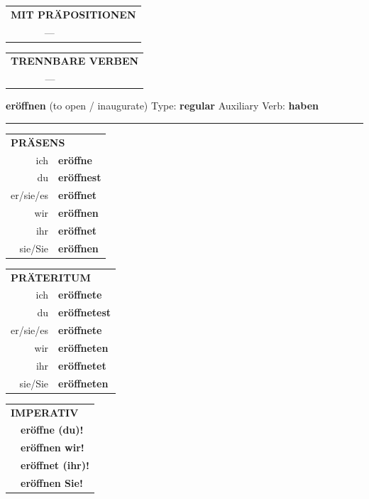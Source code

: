 \documentclass[10pt,a4paper]{revtex4-2}
\begin{document}
\begin{verbbox-acc}
\vspace{10pt}

\begin{tabular}{lll}
\multicolumn{3}{l}{\textbf{MIT PRÄPOSITIONEN}}\\
& ---\\
\end{tabular}
\hfill
\begin{tabular}{lll}
\multicolumn{3}{l}{\textbf{TRENNBARE VERBEN}}\\
& ---\\
\end{tabular}

\vspace{-5pt}
\end{verbbox-acc}

\begin{verbbox}
{\Large \bf eröffnen} (to open / inaugurate) \hfill Type: \textbf{regular} \hfill Auxiliary Verb: \textbf{haben}

\vspace{5pt}
\hrule
\vspace{5pt}

\begin{tabular}{rl}
\multicolumn{2}{l}{\textbf{PRÄSENS}}\\
ich & \textbf{eröffne}\\
du & \textbf{eröffnest}\\
er/sie/es & \textbf{eröffnet}\\
wir & \textbf{eröffnen}\\
ihr & \textbf{eröffnet}\\
sie/Sie & \textbf{eröffnen}\\
\end{tabular}
\hfill
\begin{tabular}{rl}
\multicolumn{2}{l}{\textbf{PRÄTERITUM}}\\
ich & \textbf{eröffnete}\\
du & \textbf{eröffnetest}\\
er/sie/es & \textbf{eröffnete}\\
wir & \textbf{eröffneten}\\
ihr & \textbf{eröffnetet}\\
sie/Sie & \textbf{eröffneten}\\
\end{tabular}
\hfill
\begin{tabular}{rl}
\multicolumn{2}{l}{\textbf{IMPERATIV}}\\
& \textbf{eröffne (du)!}\\
& \textbf{eröffnen wir!}\\
& \textbf{eröffnet (ihr)!}\\
& \textbf{eröffnen Sie!}\\
\end{tabular}


\end{verbbox}
\end{document}
